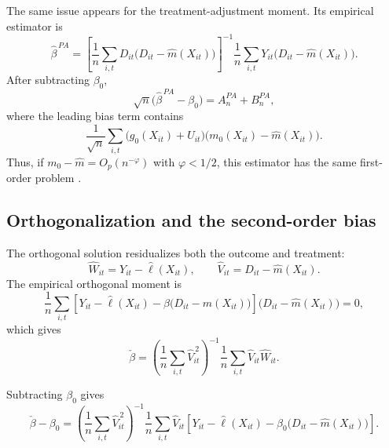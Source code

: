 \documentclass[11pt,oneside,a4paper]{book}
\begin{document}
The same issue appears for the treatment-adjustment moment. Its empirical estimator is
\begin{equation*}
\widehat{\beta}^{\,PA}
=
\left[
\frac{1}{n}\sum_{i,t}
D_{it}\bigl(D_{it}-\widehat{m}(X_{it})\bigr)
\right]^{-1}
\frac{1}{n}\sum_{i,t}
Y_{it}\bigl(D_{it}-\widehat{m}(X_{it})\bigr).
\end{equation*}
After subtracting \(\beta_0\),
\begin{equation*}
\sqrt{n}\bigl(\widehat{\beta}^{\,PA}-\beta_0\bigr)
=
A_n^{PA}+B_n^{PA},
\end{equation*}
where the leading bias term contains
\begin{equation*}
\frac{1}{\sqrt{n}}\sum_{i,t}
\bigl(g_0(X_{it})+U_{it}\bigr)
\bigl(m_0(X_{it})-\widehat{m}(X_{it})\bigr).
\end{equation*}
Thus, if \(m_0-\widehat{m}=O_p(n^{-\varphi})\) with \(\varphi<1/2\), this estimator has the same first-order problem \citep{chernozhukov2018dml}.

\subsection[Orthogonalization and the Second-Order Bias]{Orthogonalization and the second-order bias}

The orthogonal solution residualizes both the outcome and treatment:
\begin{equation*}
\widehat{W}_{it}
=
Y_{it}-\widehat{\ell}(X_{it}),
\qquad
\widehat{V}_{it}
=
D_{it}-\widehat{m}(X_{it}).
\end{equation*}
The empirical orthogonal moment is
\begin{equation*}
\frac{1}{n}\sum_{i,t}
\left[
Y_{it}-\widehat{\ell}(X_{it})
-\beta\bigl(D_{it}-\widehat{m}(X_{it})\bigr)
\right]
\bigl(D_{it}-\widehat{m}(X_{it})\bigr)
=0,
\end{equation*}
which gives
\begin{equation*}
\check{\beta}
=
\left(
\frac{1}{n}\sum_{i,t}\widehat{V}_{it}^{\,2}
\right)^{-1}
\frac{1}{n}\sum_{i,t}\widehat{V}_{it}\widehat{W}_{it}.
\end{equation*}

Subtracting \(\beta_0\) gives
\begin{equation*}
\check{\beta}-\beta_0
=
\left(
\frac{1}{n}\sum_{i,t}\widehat{V}_{it}^{\,2}
\right)^{-1}
\frac{1}{n}\sum_{i,t}
\widehat{V}_{it}
\left[
Y_{it}-\widehat{\ell}(X_{it})
-\beta_0\bigl(D_{it}-\widehat{m}(X_{it})\bigr)
\right].
\end{equation*}
\end{document}
